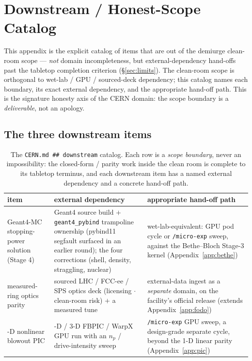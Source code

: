 \section{Downstream / Honest-Scope Catalog}
\label{app:downstream}

This appendix is the explicit catalog of items that are out of the
demiurge clean-room scope --- \emph{not} domain incompleteness, but
external-dependency hand-offs past the tabletop completion criterion
(\S\ref{sec:limits}). The clean-room scope is orthogonal to wet-lab /
GPU / sourced-deck dependency; this catalog names each boundary, its
exact external dependency, and the appropriate hand-off path. This is the
signature honesty axis of the CERN domain: the scope boundary is a
\emph{deliverable}, not an apology.

\subsection{The three downstream items}
\label{app:downstream-table}

\begin{table}[h]
\centering
\footnotesize
\setlength{\tabcolsep}{4pt}
\begin{tabular}{@{}>{\raggedright\arraybackslash}m{3.2cm} >{\raggedright\arraybackslash}m{5.1cm} >{\raggedright\arraybackslash}m{4.6cm}@{}}
\toprule
\textbf{item} & \textbf{external dependency} & \textbf{appropriate hand-off path} \\
\midrule
Geant4-MC stopping-power solution (Stage 4)
  & Geant4 source build $+$ \texttt{geant4\_pybind} trampoline ownership
    (pybind11 segfault surfaced in an earlier round); the four corrections
    (shell, density, straggling, nuclear)
  & wet-lab-equivalent: GPU pod cycle or \texttt{/micro-exp} sweep, against
    the Bethe--Bloch Stage-3 kernel (Appendix~\ref{app:bethe}) \\[4pt]
measured-ring optics parity
  & sourced LHC / FCC-ee / SPS optics deck (licensing $\cdot$ clean-room
    risk) $+$ a measured tune
  & external-data ingest as a \emph{separate} domain, on the facility's
    official release (extends Appendix~\ref{app:fodo}) \\[4pt]
2-D nonlinear blowout PIC
  & 2-D / 3-D FBPIC / WarpX GPU run with an $n_p$ / drive-intensity sweep
  & \texttt{/micro-exp} GPU sweep, a design-grade separate cycle, beyond
    the 1-D linear parity (Appendix~\ref{app:pic}) \\
\bottomrule
\end{tabular}
\caption{The \texttt{CERN.md \#\# downstream} catalog. Each row is a
\emph{scope boundary}, never an impossibility: the closed-form / parity
work inside the clean room is complete to its tabletop terminus, and each
downstream item has a named external dependency and a concrete hand-off
path.}
\label{tab:app-downstream}
\end{table}

